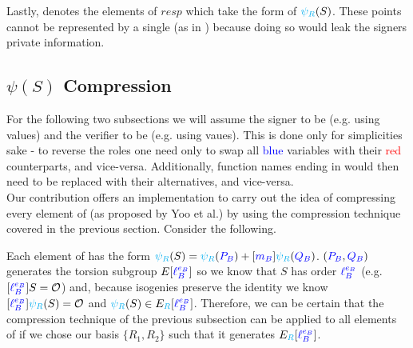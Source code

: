 Lastly,  denotes the elements of $resp$ which take the form of $\textcolor{cyan}{\psi_R}(S)$. These points cannot be represented by a single  (as in ) because doing so would leak the signers private information.\\

\subsection{$\psi(S)$ Compression}

For the following two subsections we will assume the signer to be \bob (e.g. using \rb values) and the verifier to be \alice (e.g. using \ba vaues). This is done only for simplicities sake - to reverse the roles one need only to swap all \textcolor{blue}{blue} variables with their \textcolor{red}{red} counterparts, and vice-versa. Additionally, function names ending in  would then need to be replaced with their  alternatives, and vice-versa.\\

\noindent
Our contribution offers an implementation to carry out the idea of compressing every element of  (as proposed by Yoo et al.) by using the compression technique covered in the previous section. Consider the following.

Each element of  has the form $\textcolor{cyan}{\psi_R}(S) = \textcolor{cyan}{\psi_R}(\textcolor{blue}{P_B}) + [\textcolor{blue}{m_B}]\textcolor{cyan}{\psi_R}(\textcolor{blue}{Q_B})$. $(\textcolor{blue}{P_B}, \textcolor{blue}{Q_B})$ generates the torsion subgroup $E[\textcolor{blue}{\ell_{B}^{e_B}}]$ so we know that $S$ has order $\textcolor{blue}{\ell_{B}^{e_B}}$ (e.g. $[\textcolor{blue}{\ell_{B}^{e_B}}]S = \mathcal{O}$) and, because isogenies preserve the identity we know $[\textcolor{blue}{\ell_{B}^{e_B}}]\textcolor{cyan}{\psi_R}(S) = \mathcal{O}$ and $\textcolor{cyan}{\psi_R}(S) \in E_{\textcolor{cyan}{R}}[\textcolor{blue}{\ell_{B}^{e_B}}]$. Therefore, we can be certain that the compression technique of the previous subsection can be applied to all elements of  if we chose our basis $\{R_1, R_2\}$ such that it generates $E_{\textcolor{cyan}{R}}[\textcolor{blue}{\ell_{B}^{e_B}}]$.

